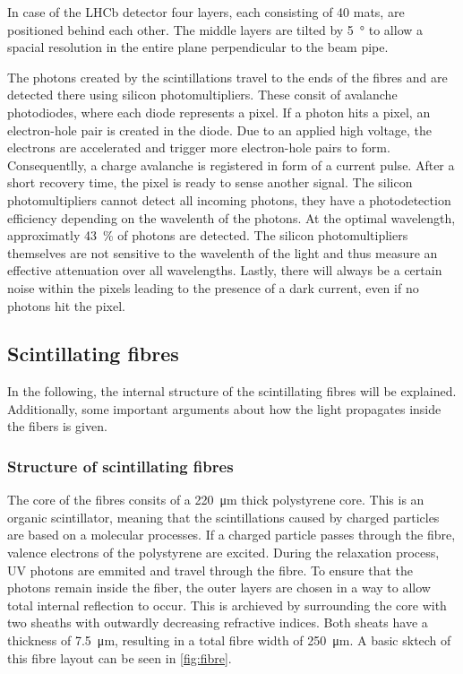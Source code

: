 In case of the LHCb detector four layers, each consisting of 40 mats, are positioned behind each other. The middle layers are tilted by \qty{5}{\degree}
to allow a spacial resolution in the entire plane perpendicular to the beam pipe.

The photons created by the scintillations travel to the ends of the fibres and are detected there using silicon photomultipliers.
These consit of avalanche photodiodes, where each diode represents a pixel. If a photon hits a pixel, an electron-hole pair is created
in the diode. Due to an applied high voltage, the electrons are accelerated and trigger more electron-hole pairs to form.
Consequentlly, a charge avalanche is registered in form of a current pulse. After a short recovery time, the pixel is ready to sense another signal.
The silicon photomultipliers cannot detect all incoming photons, they have a photodetection efficiency depending on the wavelenth of
the photons. At the optimal wavelength, approximatly \qty{43}{\percent} of photons are detected. The silicon photomultipliers themselves
are not sensitive to the wavelenth of the light and thus measure an effective attenuation over all wavelengths. Lastly, there will
always be a certain noise within the pixels leading to the presence of a dark current, even if no photons hit the pixel.

\subsection{Scintillating fibres}

In the following, the internal structure of the scintillating fibres will be explained. Additionally, some important
arguments about how the light propagates inside the fibers is given.

\subsubsection{Structure of scintillating fibres}

The core of the fibres consits of a \qty{220}{\micro\meter} thick polystyrene core. This is an organic scintillator,
meaning that the scintillations caused by charged particles are based on a molecular processes. If a charged particle
passes through the fibre, valence electrons of the polystyrene are excited. During the relaxation process, UV photons
are emmited and travel through the fibre. To ensure that the photons remain inside the fiber, the outer layers are chosen
in a way to allow total internal reflection to occur. This is archieved by surrounding the core with two sheaths with
outwardly decreasing refractive indices. Both sheats have a thickness of \qty{7.5}{\micro\meter}, resulting in a total fibre width
of \qty{250}{\micro\meter}. A basic sktech of this fibre layout can be seen in \autoref{fig:fibre}.

